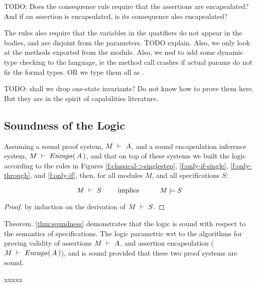 TODO: Does the consequence rule require that the assertions are encapsulated? And if an assertion is encapsulated, is its consequence also encapsulated?

The rules also require that the variables in the quatifiers do not appear in the bodies, and are disjoint from the parameters.
TODO explain. Also, we only look at the methods exported from the module.  Also, we ned to add some dynamic type checking to the language, ie the method call crashes if actual params do not fir the formal types. OR we type them all as .

TODO: shall we drop one-state invariants? Do not know how to prove them here. But they are in the spirit of capabilities literature.

\subsection{Soundness of the \SpecLang Logic}

\label{s:soundness}

\begin{theorem}[Soundness]
\label{thm:soundness}
Assuming a sound \SpecO proof system, $M\ \vdash\ A$, and
a sound encapsulation inference system, $M\ \vdash\ {Encaps(\, A\, )}$,
 and  that on top of these systems we built
 the \SpecLang logic according to the rules in Figures \ref{f:classical->singlestep},  \ref{f:only-if-single}, 
 \ref{f:only-through},  and \ref{f:only-if},   then, for    all modules $M$, and all \SpecLang specifications  $S$:
 
 $$\proves{M}{S}\ \ \ \ \ \ \ \mbox{implies}\ \ \ \ \ \  \ \ \ \satisfies{M}{S}$$
\end{theorem}

\begin{proof}
by induction on the derivation of $M\ \vdash\ S$.
\end{proof}

Theorem. \ref{thm:soundness} demonstrates 
 that the   \SpecLang logic is sound with respect to the semantics of \SpecLang specifications.
 The \SpecLang logic parametric wrt to the algorithms for proving validity of assertions
 $M\ \vdash\ A$, and 
 assertion encapsulation ($M\ \vdash\ {Encaps(\, A\, )}$), and is sound
 provided that these two proof systems are sound.


 xxxxx